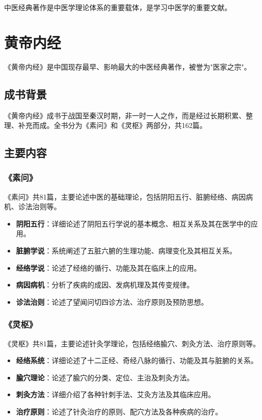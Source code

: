 \documentclass[12pt,UTF8]{ctexbook}
\begin{document}
中医经典著作是中医学理论体系的重要载体，是学习中医学的重要文献。

\section{黄帝内经}

《黄帝内经》是中国现存最早、影响最大的中医经典著作，被誉为"医家之宗"。

\subsection{成书背景}

《黄帝内经》成书于战国至秦汉时期，非一时一人之作，而是经过长期积累、整理、补充而成。全书分为《素问》和《灵枢》两部分，共162篇。

\subsection{主要内容}

\subsubsection{《素问》}

《素问》共81篇，主要论述中医的基础理论，包括阴阳五行、脏腑经络、病因病机、诊法治则等。

\begin{itemize}
\item \textbf{阴阳五行}：详细论述了阴阳五行学说的基本概念、相互关系及其在医学中的应用。
\item \textbf{脏腑学说}：系统阐述了五脏六腑的生理功能、病理变化及其相互关系。
\item \textbf{经络学说}：论述了经络的循行、功能及其在临床上的应用。
\item \textbf{病因病机}：分析了疾病的成因、发病机理及其传变规律。
\item \textbf{诊法治则}：论述了望闻问切四诊方法、治疗原则及预防思想。
\end{itemize}

\subsubsection{《灵枢》}

《灵枢》共81篇，主要论述针灸学理论，包括经络腧穴、刺灸方法、治疗原则等。

\begin{itemize}
\item \textbf{经络系统}：详细论述了十二正经、奇经八脉的循行、功能及其与脏腑的关系。
\item \textbf{腧穴理论}：论述了腧穴的分类、定位、主治及刺灸方法。
\item \textbf{刺灸方法}：详细介绍了各种针刺手法、艾灸方法及其临床应用。
\item \textbf{治疗原则}：论述了针灸治疗的原则、配穴方法及各种疾病的治疗。
\end{itemize}
\end{document}
